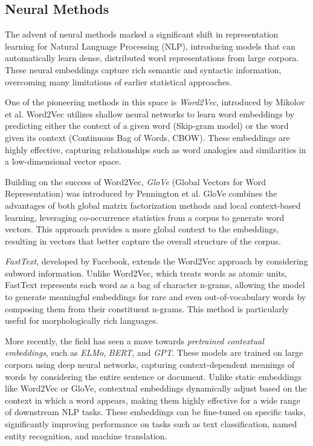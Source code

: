 \subsection{Neural Methods}

The advent of neural methods marked a significant shift in representation learning for Natural Language Processing (NLP), introducing models that can automatically learn dense, distributed word representations from large corpora. These neural embeddings capture rich semantic and syntactic information, overcoming many limitations of earlier statistical approaches.

One of the pioneering methods in this space is \textit{Word2Vec}, introduced by Mikolov et al. Word2Vec utilizes shallow neural networks to learn word embeddings by predicting either the context of a given word (Skip-gram model) or the word given its context (Continuous Bag of Words, CBOW). These embeddings are highly effective, capturing relationships such as word analogies and similarities in a low-dimensional vector space.

Building on the success of Word2Vec, \textit{GloVe} (Global Vectors for Word Representation) was introduced by Pennington et al. GloVe combines the advantages of both global matrix factorization methods and local context-based learning, leveraging co-occurrence statistics from a corpus to generate word vectors. This approach provides a more global context to the embeddings, resulting in vectors that better capture the overall structure of the corpus.

\textit{FastText}, developed by Facebook, extends the Word2Vec approach by considering subword information. Unlike Word2Vec, which treats words as atomic units, FastText represents each word as a bag of character n-grams, allowing the model to generate meaningful embeddings for rare and even out-of-vocabulary words by composing them from their constituent n-grams. This method is particularly useful for morphologically rich languages.

More recently, the field has seen a move towards \textit{pretrained contextual embeddings}, such as \textit{ELMo}, \textit{BERT}, and \textit{GPT}. These models are trained on large corpora using deep neural networks, capturing context-dependent meanings of words by considering the entire sentence or document. Unlike static embeddings like Word2Vec or GloVe, contextual embeddings dynamically adjust based on the context in which a word appears, making them highly effective for a wide range of downstream NLP tasks. These embeddings can be fine-tuned on specific tasks, significantly improving performance on tasks such as text classification, named entity recognition, and machine translation.

